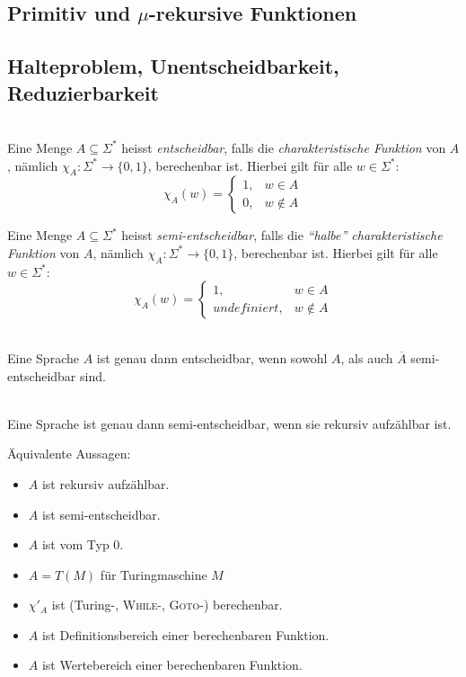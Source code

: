 \documentclass{scrartcl}
\begin{document}
\subsection*{Primitiv und $\mu$-rekursive Funktionen}

\subsection*{Halteproblem, Unentscheidbarkeit, Reduzierbarkeit}

\begin{shaded}
    \ \\Eine Menge $A\subseteq\Sigma^*$ heisst \emph{entscheidbar}, falls die \emph{charakteristische Funktion} von $A$, nämlich $\chi_A:\Sigma^*\to\{0,1\}$, berechenbar ist. Hierbei gilt für alle $w\in\Sigma^*$:
    \[
    \chi_A(w)=
    \begin{cases}
        1, & w\in A \\
        0, & w\not\in A
    \end{cases}
    \]

    Eine Menge $A\subseteq\Sigma^*$ heisst \emph{semi-entscheidbar}, falls die \emph{"`halbe"' charakteristische Funktion} von $A$, nämlich $\chi_A:\Sigma^*\to\{0,1\}$, berechenbar ist. Hierbei gilt für alle $w\in\Sigma^*$:
    \[
    \chi_A(w)=
    \begin{cases}
        1, & w\in A \\
        undefiniert, & w\not\in A
    \end{cases}
    \]
\end{shaded}

\begin{center}
\scalebox{0.75}{}
\end{center}

\begin{shaded}
    \ \\Eine Sprache $A$ ist genau dann entscheidbar, wenn sowohl $A$, als auch $\overline{A}$ semi-entscheidbar sind.
\end{shaded}
\begin{shaded}
    \ \\Eine Sprache ist genau dann semi-entscheidbar, wenn sie rekursiv aufzählbar ist.
\end{shaded}

Äquivalente Aussagen:
\begin{itemize}
    \item $A$ ist rekursiv aufzählbar.
    \item $A$ ist semi-entscheidbar.
    \item $A$ ist vom Typ 0.
    \item $A=T(M)$ für Turingmaschine $M$
    \item $\chi'_A$ ist (Turing-, \textsc{While}-, \textsc{Goto-}) berechenbar.
    \item $A$ ist Definitionsbereich einer berechenbaren Funktion.
    \item $A$ ist Wertebereich einer berechenbaren Funktion.
\end{itemize}
\end{document}

